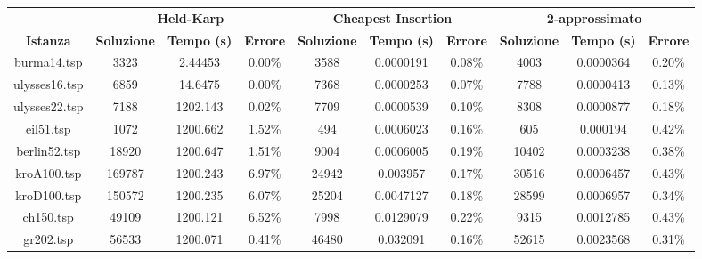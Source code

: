 \begin{longtable}{|c|c|c|c|c|c|c|c|c|c|}
\hline
\textbf{}        & \multicolumn{3}{c|}{\textbf{Held-Karp}}                   & \multicolumn{3}{c|}{\textbf{Cheapest Insertion}}          & \multicolumn{3}{c|}{\textbf{2-approssimato}}              \\ \cline{2-10} 
\textbf{Istanza} & \textbf{Soluzione} & \textbf{Tempo (s)} & \textbf{Errore} & \textbf{Soluzione} & \textbf{Tempo (s)} & \textbf{Errore} & \textbf{Soluzione} & \textbf{Tempo (s)} & \textbf{Errore} \\ \hline
burma14.tsp      & 3323               & 2.44453            & 0.00\%          & 3588               & 0.0000191          & 0.08\%          & 4003               & 0.0000364          & 0.20\%          \\ \hline
ulysses16.tsp    & 6859               & 14.6475            & 0.00\%          & 7368               & 0.0000253          & 0.07\%          & 7788               & 0.0000413          & 0.13\%          \\ \hline
ulysses22.tsp    & 7188               & 1202.143           & 0.02\%          & 7709               & 0.0000539          & 0.10\%          & 8308               & 0.0000877          & 0.18\%          \\ \hline
eil51.tsp        & 1072               & 1200.662           & 1.52\%          & 494                & 0.0006023          & 0.16\%          & 605                & 0.000194           & 0.42\%          \\ \hline
berlin52.tsp     & 18920              & 1200.647           & 1.51\%          & 9004              & 0.0006005          & 0.19\%          & 10402              & 0.0003238          & 0.38\%          \\ \hline
kroA100.tsp      & 169787             & 1200.243           & 6.97\%          & 24942              & 0.003957           & 0.17\%          & 30516              & 0.0006457          & 0.43\%          \\ \hline
kroD100.tsp      & 150572             & 1200.235           & 6.07\%          & 25204              & 0.0047127          & 0.18\%          & 28599              & 0.0006957          & 0.34\%          \\ \hline
ch150.tsp        & 49109              & 1200.121           & 6.52\%          & 7998               & 0.0129079          & 0.22\%          & 9315               & 0.0012785          & 0.43\%          \\ \hline
gr202.tsp        & 56533              & 1200.071           & 0.41\%          & 46480              & 0.032091           & 0.16\%          & 52615              & 0.0023568          & 0.31\%          \\ \hline

\end{longtable}
